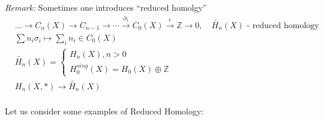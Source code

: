 \documentclass[11pt,a4paper]{report}
\begin{document}
                \emph{Remark:} Sometimes one introduces ``reduced homolgy''
                \begin{align*}
                  &\dots \rightarrow C_n(X) \rightarrow C_{n-1} \rightarrow \cdots \xrightarrow{\partial_1} C_0(X) \xrightarrow{\epsilon} \mathbb{Z} \rightarrow 0, \quad \tilde{H_n}(X) \textrm{ - reduced homology}\\
                  & \sum n_i\sigma_ i \mapsto \sum_in_i \in C_0(X)\\
                  &\tilde{H_n}(X) = \left\{\begin{array}{l}H_n(X), n > 0\\H_0^{sing}(X) = H_0(X)\oplus\mathbb{Z}\end{array} \right.\\
                  & H_n(X,\ast) \rightarrow \tilde{H_n}(X)\\
                \end{align*}
            
              Let us consider some examples of Reduced Homology: \\
\end{document}
